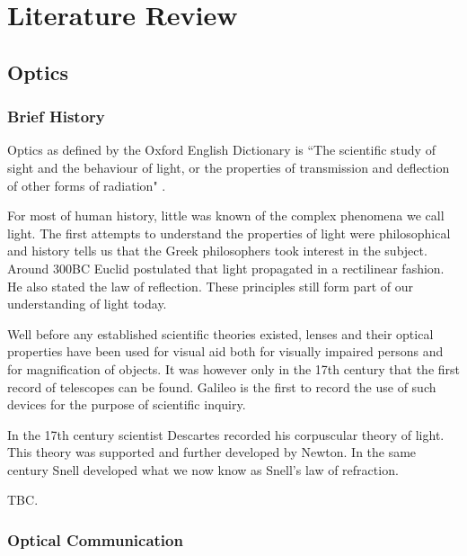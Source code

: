 \chapter{Literature Review}
\label{ch_literature}

\section{Optics}

\subsection{Brief History}

Optics as defined by the Oxford English Dictionary is ``The scientific study of sight and the behaviour of light, or the properties of transmission and deflection of other forms of radiation" \cite{oroptics2010}.

For most of human history, little was known of the complex phenomena we call light. The first attempts to understand the properties of light were philosophical and history tells us that the Greek philosophers took interest in the subject. Around 300BC Euclid postulated that light propagated in a rectilinear fashion. He also stated the law of reflection. These principles still form part of our understanding of light today. \cite{Vohnsen2004}

Well before any established scientific theories existed, lenses and their optical properties have been used for visual aid both for visually impaired persons and for magnification of objects. It was however only in the 17th century that the first record of telescopes can be found. Galileo is the first to record the use of such devices for the purpose of scientific inquiry.

In the 17th century scientist Descartes recorded his corpuscular theory of light. This theory was supported and further developed by Newton. In the same century Snell developed what we now know as Snell's law of refraction.

TBC.

\subsection{Optical Communication}

